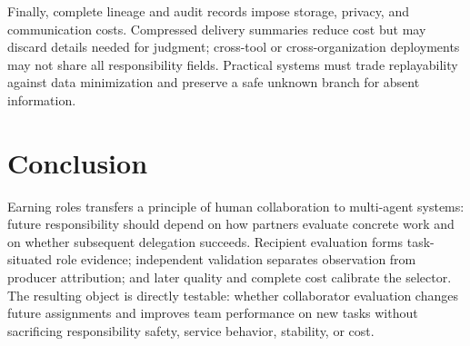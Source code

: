 \documentclass[sigconf,anonymous]{aamas}
\begin{document}
Finally, complete lineage and audit records impose storage, privacy, and communication costs. Compressed delivery summaries reduce cost but may discard details needed for judgment; cross-tool or cross-organization deployments may not share all responsibility fields. Practical systems must trade replayability against data minimization and preserve a safe unknown branch for absent information.

\section{Conclusion}
Earning roles transfers a principle of human collaboration to multi-agent systems: future responsibility should depend on how partners evaluate concrete work and on whether subsequent delegation succeeds. Recipient evaluation forms task-situated role evidence; independent validation separates observation from producer attribution; and later quality and complete cost calibrate the selector. The resulting object is directly testable: whether collaborator evaluation changes future assignments and improves team performance on new tasks without sacrificing responsibility safety, service behavior, stability, or cost.

\clearpage


\end{document}
